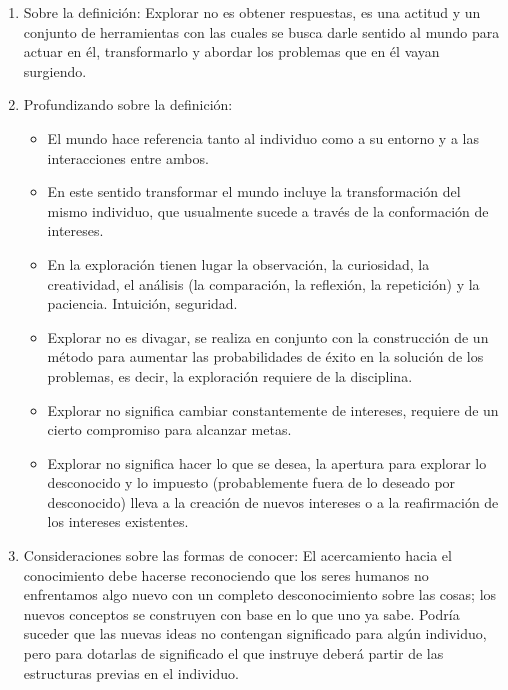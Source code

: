 \documentclass[10pt,letterpaper]{book}
\begin{document}
		\begin{enumerate}[label*=\arabic*.]
		\item Sobre la definición: Explorar no es obtener respuestas, es una actitud y un conjunto de herramientas con las cuales se busca darle sentido al mundo para actuar en él, transformarlo y abordar los problemas que en él vayan surgiendo.
		\item Profundizando sobre la definición:
		\begin{itemize} 
		\item El mundo hace referencia tanto al individuo como a su entorno y a las interacciones entre ambos. 
		\item En este sentido transformar el mundo incluye la transformación del mismo individuo, que usualmente sucede a través de la conformación de intereses.

\item En la exploración tienen lugar la observación, la curiosidad, la creatividad, el análisis (la comparación, la reflexión, la repetición) y la paciencia. Intuición, seguridad.
\item Explorar no es divagar, se realiza en conjunto con la construcción de un método para aumentar las probabilidades de éxito en la solución de los problemas, es decir, la exploración requiere de la disciplina.
\item Explorar no significa cambiar constantemente de intereses, requiere de un cierto compromiso para alcanzar metas.
\item Explorar no significa hacer lo que se desea, la apertura para explorar lo desconocido y lo impuesto (probablemente fuera de lo deseado por desconocido) lleva a la creación de nuevos intereses o a la reafirmación de los intereses existentes.

\end{itemize}
		\item Consideraciones sobre las formas de conocer:
		El acercamiento hacia el conocimiento debe hacerse reconociendo que los seres humanos no enfrentamos algo nuevo con un completo desconocimiento sobre las cosas; los nuevos conceptos se construyen con base en lo que uno ya sabe. Podría suceder que las nuevas ideas no contengan significado para algún individuo, pero para dotarlas de significado el que instruye deberá partir de las estructuras previas en el individuo.
		

\end{enumerate}
\end{document}
